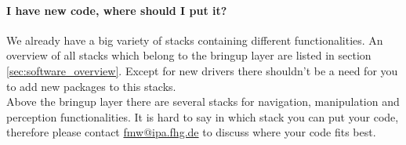 \paragraph{I have new code, where should I put it?}
We already have a big variety of stacks containing different functionalities. An overview of all stacks which belong to the bringup layer are listed in section \ref{sec:software_overview}. Except for new drivers there shouldn't be a need for you to add new packages to this stacks.\\
Above the bringup layer there are several stacks for navigation, manipulation and perception functionalities. It is hard to say in which stack you can put your code, therefore please contact \href{mailto:fmw@ipa.fhg.de}{fmw@ipa.fhg.de} to discuss where your code fits best.